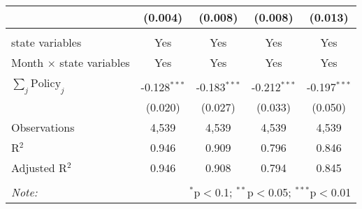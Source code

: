 \begin{tabular}{@{\extracolsep{1pt}}lcccc}
  & (0.004) & (0.008) & (0.008) & (0.013) \\ 
 \hline \\[-1.8ex] 
state variables & Yes & Yes & Yes & Yes \\ 
Month $\times$ state variables & Yes & Yes & Yes & Yes \\ 
\hline \\[-1.8ex] 
$\sum_j \mathrm{Policy}_j$ & -0.128$^{***}$ & -0.183$^{***}$ & -0.212$^{***}$ & -0.197$^{***}$ \\ 
 & (0.020) & (0.027) & (0.033) & (0.050) \\ 
Observations & 4,539 & 4,539 & 4,539 & 4,539 \\ 
R$^{2}$ & 0.946 & 0.909 & 0.796 & 0.846 \\ 
Adjusted R$^{2}$ & 0.946 & 0.908 & 0.794 & 0.845 \\ 
\hline 
\hline \\[-1.8ex] 
\textit{Note:}  & \multicolumn{4}{r}{$^{*}$p$<$0.1; $^{**}$p$<$0.05; $^{***}$p$<$0.01} \\ 
\end{tabular} 